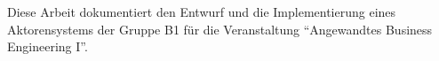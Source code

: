 Diese Arbeit dokumentiert den Entwurf und die Implementierung eines Aktorensystems der Gruppe B1 für die Veranstaltung \enquote{Angewandtes Business Engineering I}.